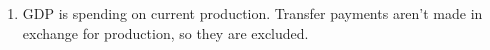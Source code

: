 \documentclass{article}
\begin{document}
\begin{enumerate}
\item GDP is spending on current production. Transfer payments aren't made in exchange for production, so they are excluded.

\end{enumerate}
\end{document}
